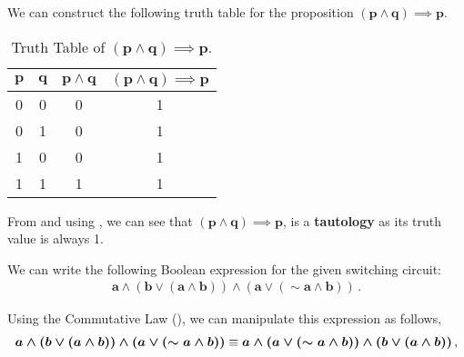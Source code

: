 \begin{subquestions}
	
\subquestion
	
We can construct the following truth table for the proposition $\boldsymbol{(p \land q) \implies p}$.
\begin{table}[ht]
		\centering
		\begin{tabular}{|c|c|c|c|}
			\hline
			$\boldsymbol{p}$ & $\boldsymbol{q}$ & $\boldsymbol{p \land q}$ & $\boldsymbol{(p \land q) \implies p}$ \\
			\hline
			0 & 0 & 0 & 1 \\
			0 & 1 & 0 & 1 \\
			1 & 0 & 0 & 1 \\
			1 & 1 & 1 & 1 \\
			\hline
		\end{tabular}
		\caption{\label{2015:q2:tab:TrthTab} Truth Table of $\boldsymbol{(p \land q) \implies p}$.}
\end{table}        
	
From  and using , we can see that $\boldsymbol{(p \land q) \implies p}$, is a \textbf{tautology} as its truth value is always 1. \\
	
		
\subquestion
	
\begin{subsubquestions}
		
\subsubquestion
		
We can write the following Boolean expression for the given switching circuit:
		\begin{align}
			\boldsymbol{a \land (b \lor (a \land b)) \land (a \lor (\sim a \land b))}\,.
		\end{align}	
		

\subsubquestion
		
Using the Commutative Law (), we can manipulate this expression as follows,
		\begin{align}
			\boldsymbol{a \land (b \lor (a \land b)) \land (a \lor (\sim a \land b))}
			 \equiv \boldsymbol{a \land (a \lor (\sim a \land b)) \land (b \lor (a \land b))}\,, \label{2015:q2:BooleanEquation} \nonumber \\
		\end{align}
		

\end{subsubquestions}
\end{subquestions}
